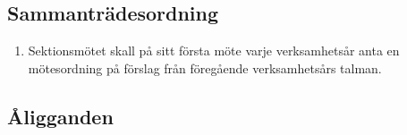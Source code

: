 \documentclass[11pt,a4paper]{article}
\begin{document}
\subsection{Sammanträdesordning}

\begin{enumerate}[\thesubsection .1]

  \item Sektionsmötet skall på sitt första möte varje verksamhetsår anta en mötesordning på förslag från föregående verksamhetsårs talman.

\end{enumerate}

\subsection{Åligganden}
\end{document}
